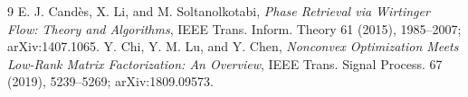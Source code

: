 \documentclass[11pt]{article}
\begin{document}
\begin{thebibliography}{9}
E. J. Cand\`es, X. Li, and M. Soltanolkotabi,
\emph{Phase Retrieval via Wirtinger Flow: Theory and Algorithms},
IEEE Trans. Inform. Theory 61 (2015), 1985--2007; arXiv:1407.1065.
Y. Chi, Y. M. Lu, and Y. Chen,
\emph{Nonconvex Optimization Meets Low-Rank Matrix Factorization: An Overview},
IEEE Trans. Signal Process. 67 (2019), 5239--5269; arXiv:1809.09573.
\end{thebibliography}
\end{document}
